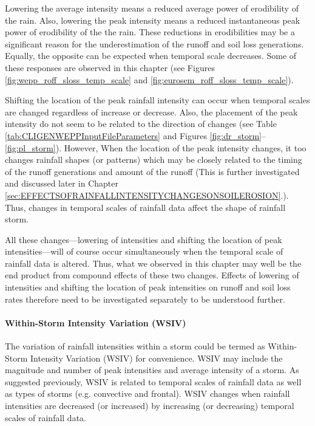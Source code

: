 Lowering the average intensity means a reduced average power of erodibility
of the rain. Also, lowering the peak intensity means a reduced instantaneous
peak power of erodibility of the the rain. These reductions in erodibilities may
be a significant reason for the underestimation of the runoff and soil loss
generations. Equally, the opposite can be expected when temporal scale
decreases. Some of these responses are observed in this chapter (see Figures
\ref{fig:wepp_roff_sloss_temp_scale} and
\ref{fig:eurosem_roff_sloss_temp_scale}).

Shifting the location of the peak rainfall intensity can occur when temporal
scales are changed regardless of increase or decrease. Also, the placement of
the peak intensity do not seem to be related to the direction of changes (see
Table \ref{tab:CLIGENWEPPInputFileParameters} and Figures
\ref{fig:dr_storm}--\ref{fig:pl_storm}). However, When the location of the peak
intensity changes, it too changes rainfall shapes (or patterns) which may be
closely related to the timing of the runoff generations and amount of the runoff
(This is further investigated and discussed later in Chapter
\ref{sec:EFFECTSOFRAINFALLINTENSITYCHANGESONSOILEROSION}.). Thus, changes in
temporal scales of rainfall data affect the shape of rainfall storm.

All these changes---lowering of intensities and shifting the location of peak
intensities---will of course occur simultaneously when the temporal scale of
rainfall data is altered. Thus, what we observed in this chapter may well be the
end product from compound effects of these two changes. Effects of lowering of
intensities and shifting the location of peak intensities on runoff and
soil loss rates therefore need to be investigated separately to be understood
further.

\paragraph{Within-Storm Intensity Variation (WSIV)} The variation of rainfall
intensities within a storm could be termed as Within-Storm Intensity Variation
(WSIV) for convenience. WSIV may include the magnitude and number of peak
intensities and average intensity of a storm. As suggested previously, WSIV is
related to temporal scales of rainfall data as well as types of storms (e.g.
convective and frontal). WSIV changes when rainfall intensities are decreased
(or increased) by increasing (or decreasing) temporal scales of rainfall data.

